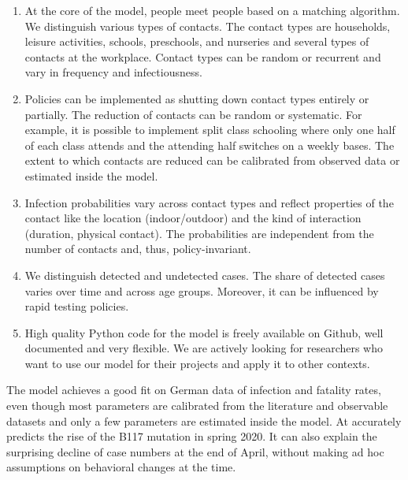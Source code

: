\begin{enumerate}
    \item At the core of the model, people meet people based on a matching algorithm. We
          distinguish various types of contacts. The contact types are households,
          leisure activities, schools, preschools, and nurseries and several types of
          contacts at the workplace. Contact types can be random or recurrent and vary
          in frequency and infectiousness.

    \item Policies can be implemented as shutting down contact types entirely or
          partially. The reduction of contacts can be random or systematic. For example,
          it is possible to implement split class schooling where only one half of each
          class attends and the attending half switches on a weekly bases. The extent to
          which contacts are reduced can be calibrated from observed data or estimated
          inside the model.

    \item Infection probabilities vary across contact types and reflect properties of
          the contact like the location (indoor/outdoor) and the kind of interaction
          (duration, physical contact). The probabilities are independent from the
          number of contacts and, thus, policy-invariant.

    \item We distinguish detected and undetected cases. The share of detected cases
    varies over time and across age groups. Moreover, it can be influenced by rapid
    testing policies.
    \item High quality Python code for the model is freely available on Github, well
          documented and very flexible\footnotemark. We are actively looking for
          researchers who want to use our model for their projects and apply it to other
          contexts.
\end{enumerate}


The model achieves a good fit on German data of infection and fatality rates, even
though most parameters are calibrated from the literature and observable datasets and
only a few parameters are estimated inside the model. At accurately predicts the rise of
the B117 mutation in spring 2020. It can also explain the surprising decline of case
numbers at the end of April, without making ad hoc assumptions on behavioral changes at
the time.

